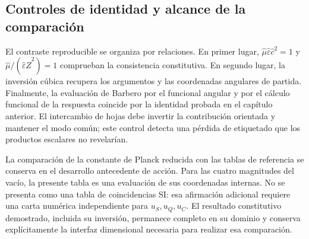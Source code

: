 \subsection{Controles de identidad y alcance de la comparación}

El contraste reproducible se organiza por relaciones. En primer lugar,
$\widehat\mu\widehat\varepsilon\widehat c^2=1$ y
$\widehat\mu/(\widehat\varepsilon\widehat Z^2)=1$ comprueban la
consistencia constitutiva. En segundo lugar, la inversión cúbica recupera
los argumentos y las coordenadas angulares de partida. Finalmente, la
evaluación de Barbero por el funcional angular y por el cálculo funcional
de la respuesta coincide por la identidad probada en el capítulo anterior.
El intercambio de hojas debe invertir la contribución orientada y mantener
el modo común; este control detecta una pérdida de etiquetado que los
productos escalares no revelarían.

La comparación de la constante de Planck reducida con las tablas de
referencia se conserva en el desarrollo antecedente de acción. Para las
cuatro magnitudes del vacío, la presente tabla es una evaluación de sus
coordenadas internas. No se presenta como una tabla de coincidencias SI:
esa afirmación adicional requiere una carta numérica independiente para
$u_S,u_Q,u_C$. El resultado constitutivo demostrado, incluida su inversión,
permanece completo en su dominio y conserva explícitamente la interfaz
dimensional necesaria para realizar esa comparación.
